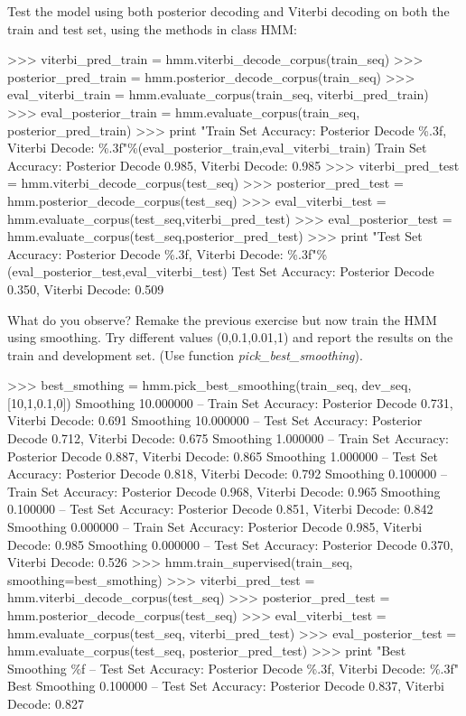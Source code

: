 \begin{exercise}
Test the model using both posterior decoding and Viterbi decoding on
both the train and test set, using the methods in class HMM:
\begin{python}
>>> viterbi_pred_train = hmm.viterbi_decode_corpus(train_seq)
>>> posterior_pred_train = hmm.posterior_decode_corpus(train_seq)
>>> eval_viterbi_train =   hmm.evaluate_corpus(train_seq, viterbi_pred_train)
>>> eval_posterior_train =  hmm.evaluate_corpus(train_seq, posterior_pred_train)
>>> print "Train Set Accuracy: Posterior Decode \%.3f, Viterbi Decode: \%.3f"\%(eval_posterior_train,eval_viterbi_train)
Train Set Accuracy: Posterior Decode 0.985, Viterbi Decode: 0.985
>>> viterbi_pred_test = hmm.viterbi_decode_corpus(test_seq)
>>> posterior_pred_test = hmm.posterior_decode_corpus(test_seq)
>>> eval_viterbi_test =   hmm.evaluate_corpus(test_seq,viterbi_pred_test)
>>> eval_posterior_test = hmm.evaluate_corpus(test_seq,posterior_pred_test)
>>> print "Test Set Accuracy: Posterior Decode \%.3f, Viterbi Decode: \%.3f"\%(eval_posterior_test,eval_viterbi_test)
Test Set Accuracy: Posterior Decode 0.350, Viterbi Decode: 0.509
\end{python}

What do you observe? Remake the previous exercise but now train the HMM
using smoothing. Try different values (0,0.1,0.01,1) and report the results on the
train and development set. (Use function
\emph{pick\_best\_smoothing}).


\begin{python}
>>> best_smothing = hmm.pick_best_smoothing(train_seq, dev_seq, [10,1,0.1,0])
Smoothing 10.000000 --  Train Set Accuracy: Posterior Decode 0.731, Viterbi Decode: 0.691
Smoothing 10.000000 -- Test Set Accuracy: Posterior Decode 0.712, Viterbi Decode: 0.675
Smoothing 1.000000 --  Train Set Accuracy: Posterior Decode 0.887, Viterbi Decode: 0.865
Smoothing 1.000000 -- Test Set Accuracy: Posterior Decode 0.818, Viterbi Decode: 0.792
Smoothing 0.100000 --  Train Set Accuracy: Posterior Decode 0.968, Viterbi Decode: 0.965
Smoothing 0.100000 -- Test Set Accuracy: Posterior Decode 0.851, Viterbi Decode: 0.842
Smoothing 0.000000 --  Train Set Accuracy: Posterior Decode 0.985, Viterbi Decode: 0.985
Smoothing 0.000000 -- Test Set Accuracy: Posterior Decode 0.370, Viterbi Decode: 0.526
>>> hmm.train_supervised(train_seq, smoothing=best_smothing)
>>> viterbi_pred_test = hmm.viterbi_decode_corpus(test_seq)
>>> posterior_pred_test = hmm.posterior_decode_corpus(test_seq)
>>> eval_viterbi_test =   hmm.evaluate_corpus(test_seq, viterbi_pred_test)
>>> eval_posterior_test = hmm.evaluate_corpus(test_seq, posterior_pred_test)
>>> print "Best Smoothing \%f --  Test Set Accuracy: Posterior Decode \%.3f, Viterbi Decode: \%.3f"%
Best Smoothing 0.100000 --  Test Set Accuracy: Posterior Decode 0.837, Viterbi Decode: 0.827
\end{python}



\end{exercise}
